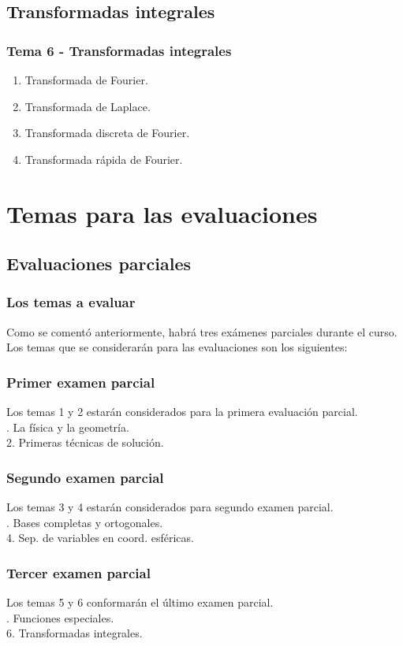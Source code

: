 \documentclass[12pt]{beamer}
\begin{document}
\subsection{Transformadas integrales}
\begin{frame}
\frametitle{Tema 6 - Transformadas integrales}
\begin{enumerate}[<+->]
\item Transformada de Fourier.
\item Transformada de Laplace.
\item Transformada discreta de Fourier.
\item Transformada rápida de Fourier.
\end{enumerate}
\end{frame}
 
\section{Temas para las evaluaciones}
\subsection{Evaluaciones parciales}

\begin{frame}
\frametitle{Los temas a evaluar}
Como se comentó anteriormente, habrá tres exámenes parciales durante el curso.
\\
\bigskip
\pause
Los temas que se considerarán para las evaluaciones son los siguientes:
\end{frame}
\begin{frame}
\frametitle{Primer examen parcial}
Los temas 1 y 2 estarán considerados para la primera evaluación parcial.
\\
\bigskip
{}. La física y la geometría. \\
2. Primeras técnicas de solución.
\end{frame}
\begin{frame}
\frametitle{Segundo examen parcial}
Los temas 3 y 4 estarán considerados para segundo examen parcial.
\\
\bigskip
{}. Bases completas y ortogonales. \\
4. Sep. de variables en coord. esféricas.
\end{frame}
\begin{frame}
\frametitle{Tercer examen parcial}
Los temas 5 y 6 conformarán el último examen parcial.
\\
\bigskip
{}. Funciones especiales. \\
6. Transformadas integrales.
\end{frame}
\end{document}
